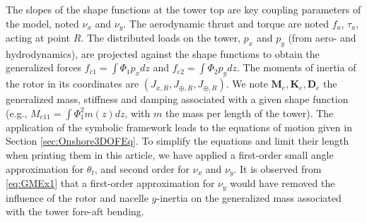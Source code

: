 \documentclass[wes, manuscript]{copernicus}
\renewcommand{\v}[1]{\boldsymbol{#1}}
\newcommand{\m}[1]{\boldsymbol{#1}}
\begin{document}
The slopes of the shape functions at the tower top are key coupling parameters of the model, noted $\nu_x$ and $\nu_y$. 
The aerodynamic thrust and torque are noted $f_a$, $\tau_a$, acting at point $R$.
The distributed loads on the tower, $p_x$ and $p_y$ (from aero- and hydrodynamics), are projected against the shape functions to obtain the generalized forces $f_{e1}=\int \Phi_1 p_x dz$ and  $f_{e2}=\int \Phi_2 p_y dz$. 
The moments of inertia of the rotor in its coordinates are $(J_{x,R}, J_{\oplus,R}, J_{\oplus,R})$.
We note $\m{M}_e, \m{K}_e, \m{D}_e$  the generalized mass, stiffness and damping associated with a given shape function (e.g., $M_{e11}=\int \Phi_1^2 m(z) dz$, with $m$ the mass per length of the tower). 
The application of the symbolic framework leads to the equations of motion given in Section \ref{sec:Onshore3DOFEq}.
To simplify the equations and limit their length when printing them in this article, we have applied a first-order small angle approximation for $\theta_t$, and second order for $\nu_x$ and $\nu_y$.
It is observed from \autoref{eq:GMEx1} that a first-order approximation for $\nu_y$ would have removed the influence of the rotor and nacelle $y$-inertia on the generalized mass associated with the tower fore-aft bending. 
\end{document}
